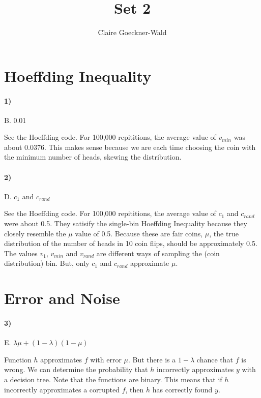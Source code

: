 \documentclass[10pt,letter]{article}
\begin{document}
\title{Set 2}
\author{Claire Goeckner-Wald}
\maketitle 

\section*{Hoeffding Inequality}

\paragraph{1)} B. 0.01

	See the Hoeffding code. For 100,000 repititions, the average value of $v_{min}$ was about 0.0376. This makes sense because we are each time choosing the coin with the minimum number of heads, skewing the distribution. 

\paragraph{2)} D. $c_1$ and $c_{rand}$

	See the Hoeffding code. For 100,000 repititions, the average value of $c_1$ and $c_{rand}$ were about 0.5. They satisify the single-bin Hoeffding Inequality because they closely resemble the $\mu$ value of 0.5. Because these are fair coins, $\mu$, the true distribution of the number of heads in 10 coin flips, should be approximately 0.5. The values $v_1$, $v_{min}$ and $v_{rand}$ are different ways of sampling the (coin distribution) bin. But, only $c_1$ and $c_{rand}$ approximate $\mu$.

\section*{Error and Noise}

\paragraph{3)} E. $\lambda \mu + (1 - \lambda)(1 - \mu)$

	Function $h$ approximates $f$ with error $\mu$. But there is a $1-\lambda$ chance that $f$ is wrong. We can determine the probability that $h$ incorrectly approximates $y$ with a decision tree. Note that the functions are binary. This means that if $h$ incorrectly approximates a corrupted $f$, then $h$ has correctly found $y$. \newpage
\end{document}
